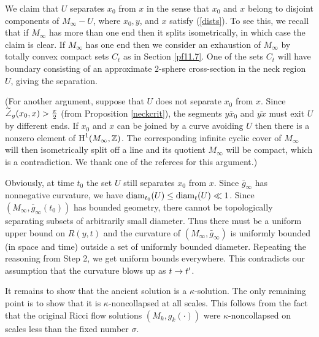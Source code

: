 We claim that $U$ separates
$x_0$ from $x$ in the sense that $x_0$ and $x$ belong
to disjoint components of $M_\infty - U$, where $x_0, y$, and $x$
satisfy (\ref{dists}).
To see this, we
recall that if $M_\infty$ has more than one end then it splits
isometrically, in which case the claim is clear. If $M_\infty$ has
one end then we consider an exhaustion of $M_\infty$ by totally
convex compact sets $C_t$ as in Section \ref{pf11.7}. One of the
sets $C_t$ will have boundary consisting of an approximate $2$-sphere
cross-section in the neck region $U$, giving the separation.

(For another argument, suppose that $U$ does not separate $x_0$ from
$x$. Since $\widetilde{\angle}_y(x_0, x) > \frac{\pi}{2}$ (from Proposition \ref{neckcrit}),
the segments $\overline{yx_0}$ and $\overline{yx}$ must exit $U$ by
different ends.  If $x_0$ and $x$ can be joined by a curve avoiding $U$
then there is a nonzero element of
$\operatorname{H}^1(M_\infty, {\mathbb Z})$. The corresponding infinite cyclic cover of $M_\infty$ will then
isometrically split off a line and its quotient $M_\infty$ will be
compact, which is a contradiction.  We thank one of the referees for
this argument.)

Obviously, at time $t_0$ the set
$U$ still separates $x_0$ from $x$.
Since $\bar g_\infty$ has nonnegative curvature,
we have $\operatorname{diam}_{t_0}(U)\leq \operatorname{diam}_t(U)\ll 1$.
Since $(M_\infty,\bar g_\infty({t_0}))$ has bounded geometry,
there cannot be topologically separating subsets of arbitrarily small
diameter.
Thus there must be a uniform upper bound on $R(y, t)$
and the curvature of $(M_\infty,\bar g_\infty)$ is uniformly bounded
(in space and time)
outside a set of uniformly bounded diameter.  Repeating the reasoning
from Step 2, we get uniform bounds everywhere.  This contradicts
our assumption that the curvature blows up as $t\rightarrow t'$.

It remains to show that the ancient solution is a $\kappa$-solution.
The only remaining point is to show that it is $\kappa$-noncollapsed
at all scales. This follows from the fact that the original Ricci
flow solutions $(M_k, g_k(\cdot))$ were $\kappa$-noncollapsed on
scales less than the fixed number $\sigma$.
\endgroup\par\medskip

